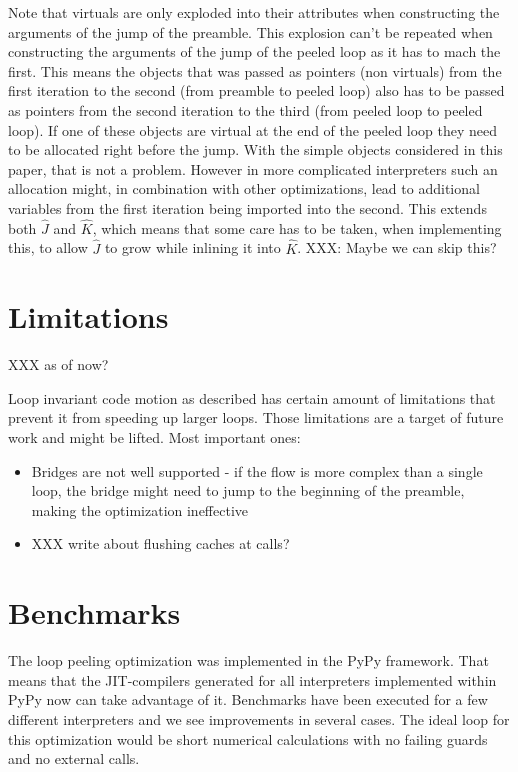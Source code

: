 \documentclass[preprint]{sigplanconf}
\begin{document}
Note that virtuals are only exploded into their attributes when
constructing the arguments of the jump of the preamble. This
explosion can't be repeated when constructing the arguments of the
jump of the peeled loop as it has to mach the first. This means
the objects that was passed as pointers (non virtuals) from the first
iteration to the second (from preamble to peeled loop) also has to be
passed as pointers from the second iteration to the third (from peeled
loop to peeled loop). If one of these objects are virtual 
at the end of the peeled loop they need to be allocated right
before the jump. With the simple objects considered in this paper,
that is not a problem. However in more complicated interpreters such
an allocation might, in combination with other optimizations, lead
to additional variables from the first iteration being imported into
the second. This extends both $\hat J$ and $\hat K$, which means that
some care has to be taken, when implementing this, to allow $\hat J$ to
grow while inlining it into $\hat K$. XXX: Maybe we can skip this?

\section{Limitations}

XXX as of now?

Loop invariant code motion as described has certain amount of limitations
that prevent it from speeding up larger loops. Those limitations are a target
of future work and might be lifted. Most important ones:

\begin{itemize}
\item Bridges are not well supported - if the flow is more complex than a single
      loop, the bridge might need to jump to the beginning of the preamble,
      making the optimization ineffective
\item XXX write about flushing caches at calls?
\end{itemize}

\section{Benchmarks}

The loop peeling optimization was implemented in the PyPy
framework. That means that the JIT-compilers generated for all
interpreters implemented within PyPy now can take advantage of
it. Benchmarks have been executed for a few different interpreters and
we see improvements in several cases. The ideal loop for this optimization
would be short numerical calculations with no failing guards and no
external calls.
\end{document}
